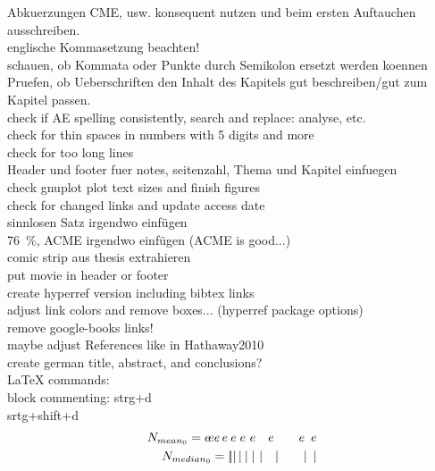 	Abkuerzungen CME, usw. konsequent nutzen und beim ersten Auftauchen ausschreiben.\\

	englische Kommasetzung beachten!\\
	schauen, ob Kommata oder Punkte durch Semikolon ersetzt werden koennen\\
	Pruefen, ob Ueberschriften den Inhalt des Kapitels gut beschreiben/gut zum Kapitel passen.\\
	check if AE spelling consistently, search and replace: analyse, etc.\\
	check for thin spaces in numbers with 5 digits and more\\
	check for too long lines\\
	
	Header und footer fuer notes, seitenzahl, Thema und Kapitel einfuegen\\
	check gnuplot plot text sizes and finish figures\\
	
	check for changed links and update access date\\
	
	sinnlosen Satz irgendwo einfügen\\
	76~\%, ACME irgendwo einfügen (ACME is good...)\\
	comic strip aus thesis extrahieren\\
	put movie in header or footer\\

	create hyperref version including bibtex links\\
		adjust link colors and remove boxes... (hyperref package options)\\
		remove google-books links!\\
		maybe adjust References like in Hathaway2010\\

		
	create german title, abstract, and conclusions?\\


LaTeX commands:\\
block commenting: strg+d\\
srtg+shift+d\\

\begin{align}
	N_{mean_0} = e\!ee\,e\:e\;e\ e\quad e\qquad e\enskip e\\	%
	N_{median_0} = |\!||\,|\:|\;|\ |\quad|\qquad|\enskip|
\end{align}

